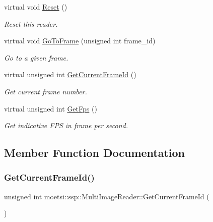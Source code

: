 \begin{DoxyCompactItemize}
\mbox{\label{classmoetsi_1_1ssp_1_1MultiImageReader_a3a60b57e1db97cb170435dd7f0d4c66d}} 
virtual void \hyperlink{classmoetsi_1_1ssp_1_1MultiImageReader_a3a60b57e1db97cb170435dd7f0d4c66d}{Reset} ()
\begin{DoxyCompactList}\small\item\em Reset this reader. \end{DoxyCompactList}\item 
virtual void \hyperlink{classmoetsi_1_1ssp_1_1MultiImageReader_a7c552a1ad469660ea0a88b9ca85138ad}{Go\+To\+Frame} (unsigned int frame\+\_\+id)
\begin{DoxyCompactList}\small\item\em Go to a given frame. \end{DoxyCompactList}\item 
virtual unsigned int \hyperlink{classmoetsi_1_1ssp_1_1MultiImageReader_a994eea20e9682c2f4afc9303a34c76f3}{Get\+Current\+Frame\+Id} ()
\begin{DoxyCompactList}\small\item\em Get current frame number. \end{DoxyCompactList}\item 
virtual unsigned int \hyperlink{classmoetsi_1_1ssp_1_1MultiImageReader_ad0a249af66f8e1a063c3e575fc1b94cb}{Get\+Fps} ()
\begin{DoxyCompactList}\small\item\em Get indicative F\+PS in frame per second. \end{DoxyCompactList}\end{DoxyCompactItemize}


\subsection{Member Function Documentation}
\mbox{\label{classmoetsi_1_1ssp_1_1MultiImageReader_a994eea20e9682c2f4afc9303a34c76f3}} 
\subsubsection{\texorpdfstring{Get\+Current\+Frame\+Id()}{GetCurrentFrameId()}}
{\footnotesize\ttfamily unsigned int moetsi\+::ssp\+::\+Multi\+Image\+Reader\+::\+Get\+Current\+Frame\+Id (\begin{DoxyParamCaption}{ }\end{DoxyParamCaption})\hspace{0.3cm}{\ttfamily [virtual]}}



